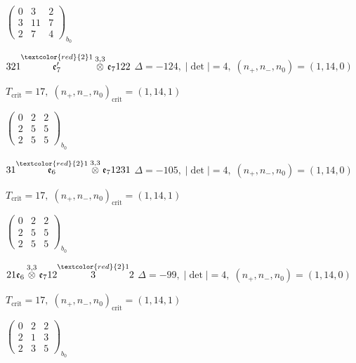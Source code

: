\documentclass[10pt]{article}
\begin{document}
\hspace{2em}$\left(\begin{smallmatrix}0 & 3 & 2 \\ 3 & 11 & 7 \\ 2 & 7 & 4\end{smallmatrix}\right)_{\!b_0}$

\smallskip

$321\overset{\textcolor{red}{2}1}{\mathfrak{e}_7'}\overset{3,3}{\otimes}\mathfrak{e}_7122$ \quad $\Delta=-124,\; |\det|=4,\; (n_+,n_-,n_0)=(1,14,0)$

\hspace{1em}$T_{\text{crit}}=17,\; (n_+,n_-,n_0)_{\text{crit}}=(1,14,1)$

\hspace{2em}$\left(\begin{smallmatrix}0 & 2 & 2 \\ 2 & 5 & 5 \\ 2 & 5 & 5\end{smallmatrix}\right)_{\!b_0}$

\smallskip

$31\overset{\textcolor{red}{2}1}{\mathfrak{e}_6}\overset{3,3}{\otimes}\mathfrak{e}_71231$ \quad $\Delta=-105,\; |\det|=4,\; (n_+,n_-,n_0)=(1,14,0)$

\hspace{1em}$T_{\text{crit}}=17,\; (n_+,n_-,n_0)_{\text{crit}}=(1,14,1)$

\hspace{2em}$\left(\begin{smallmatrix}0 & 2 & 2 \\ 2 & 5 & 5 \\ 2 & 5 & 5\end{smallmatrix}\right)_{\!b_0}$

\smallskip

$21\mathfrak{e}_6\overset{3,3}{\otimes}\mathfrak{e}_712\overset{\textcolor{red}{2}1}{3}2$ \quad $\Delta=-99,\; |\det|=4,\; (n_+,n_-,n_0)=(1,14,0)$

\hspace{1em}$T_{\text{crit}}=17,\; (n_+,n_-,n_0)_{\text{crit}}=(1,14,1)$

\hspace{2em}$\left(\begin{smallmatrix}0 & 2 & 2 \\ 2 & 1 & 3 \\ 2 & 3 & 5\end{smallmatrix}\right)_{\!b_0}$
\end{document}
